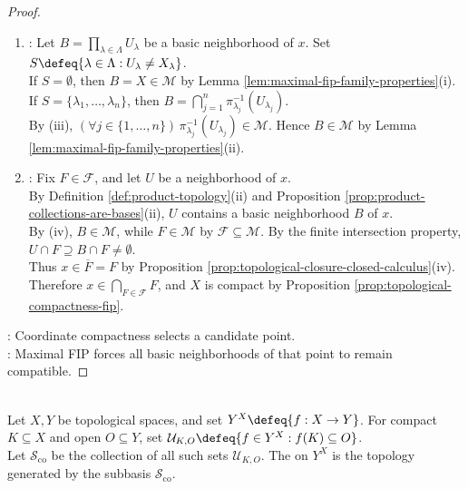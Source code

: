 \begin{theorem}
\begin{proof}
\begin{enumerate}[label=(\roman*)]
Since $x_\lambda\in\overline{\pi_\lambda(P)}$, one has $O\cap\pi_\lambda(P)\neq\emptyset$, and hence $N\cap P\neq\emptyset$. Therefore $N\in\mathcal{M}$ by Lemma \ref{lem:maximal-fip-family-properties}(iii).
\item {}: Let $B=\prod\limits_{\lambda\in\Lambda}U_\lambda$ be a basic neighborhood of $x$. Set $S\defeq\{\lambda\in\Lambda:U_\lambda\neq X_\lambda\}$.\\
If $S=\emptyset$, then $B=X\in\mathcal{M}$ by Lemma \ref{lem:maximal-fip-family-properties}(i). If $S=\{\lambda_1,\ldots,\lambda_n\}$, then $B=\bigcap\limits_{j=1}^n\pi_{\lambda_j}^{-1}(U_{\lambda_j})$.\\
By (iii), $(\forall j\in\{1,\ldots,n\})\,\pi_{\lambda_j}^{-1}(U_{\lambda_j})\in\mathcal{M}$. Hence $B\in\mathcal{M}$ by Lemma \ref{lem:maximal-fip-family-properties}(ii).
\item {}: Fix $F\in\mathcal{F}$, and let $U$ be a neighborhood of $x$.\\
By Definition \ref{def:product-topology}(ii) and Proposition \ref{prop:product-collections-are-bases}(ii), $U$ contains a basic neighborhood $B$ of $x$.\\
By (iv), $B\in\mathcal{M}$, while $F\in\mathcal{M}$ by $\mathcal{F}\subseteq\mathcal{M}$. By the finite intersection property, $U\cap F\supseteq B\cap F\neq\emptyset$.\\
Thus $x\in\overline{F}=F$ by Proposition \ref{prop:topological-closure-closed-calculus}(iv). Therefore $x\in\bigcap\limits_{F\in\mathcal{F}}F$, and $X$ is compact by Proposition \ref{prop:topological-compactness-fip}.
\end{enumerate}
: Coordinate compactness selects a candidate point.\\
: Maximal FIP forces all basic neighborhoods of that point to remain compatible.
\end{proof}
\end{theorem}

\begin{definition} \label{def:compact-open-topology} \\
Let $X,Y$ be topological spaces, and set $Y^X\defeq\{f:X\to Y\}$. For compact $K\subseteq X$ and open $O\subseteq Y$, set $\mathcal{U}_{K,O}\defeq\{f\in Y^X:f(K)\subseteq O\}$.\\
Let $\mathcal{S}_{\mathrm{co}}$ be the collection of all such sets $\mathcal{U}_{K,O}$. The  on $Y^X$ is the topology generated by the subbasis $\mathcal{S}_{\mathrm{co}}$.
\end{definition}

